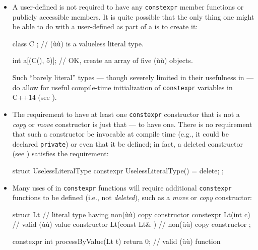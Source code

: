 \begin{itemize}
\item{A user-defined  is not required to have any \lstinline!constexpr! member functions or publicly accessible members. It is quite possible that the only thing one might be able to do with a user-defined  as part of a  is to create it:

\begin{emcppslisting}
class C { };  // (ù{}ù) is a valueless literal type.

int a[(C(), 5)];  // OK, create an array of five (ù{}ù) objects.
\end{emcppslisting}


Such ``barely literal'' types --- though severely limited in their
usefulness in  --- do allow for useful
compile-time initialization of \lstinline!constexpr! variables in C++14
(see ).}

\item{The requirement to have at least one \lstinline!constexpr! constructor that is not a \emph{copy} or \emph{move} constructor is just that — to have one. There is no requirement that such a constructor be invocable at compile time (e.g., it could be declared \lstinline!private!) or even that it be defined; in fact, a deleted constructor (see ) satisfies the requirement:

\begin{emcppslisting}
struct UselessLiteralType
{
    constexpr UselessLiteralType() = delete;
};
\end{emcppslisting}
}


\item{Many uses of  in \lstinline!constexpr! functions will require additional \lstinline!constexpr! functions to be defined (i.e., not \emph{deleted}), such as a \emph{move} or \emph{copy} constructor:

\begin{emcppslisting}
struct Lt  // literal type having non(ù{}ù) copy constructor
{
    constexpr Lt(int c) { }  // valid (ù{}ù) value constructor
    Lt(const Lt& ) { }       // non(ù{}ù) copy constructor
};

constexpr int processByValue(Lt t) { return 0; }  // valid (ù{}ù) function


\end{emcppslisting}}
\end{itemize}
